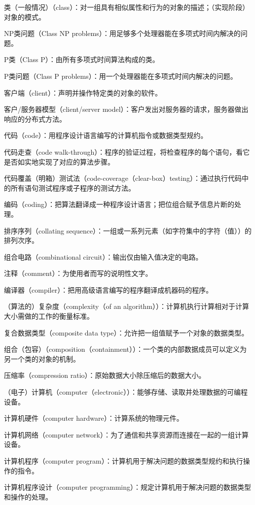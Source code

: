 类（一般情况）（class）：对一组具有相似属性和行为的对象的描述；（实现阶段）对象的模式。

NP类问题（Class NP problems）：用足够多个处理器能在多项式时间内解决的问题。

P类（Class P）：由所有多项式时间算法构成的类。

P类问题（Class P problems）：用一个处理器能在多项式时间内解决的问题。

客户端（client）：声明并操作特定类的对象的软件。

客户/服务器模型（client/server model）：客户发出对服务器的请求，服务器做出响应的分布式方法。

代码（code）：用程序设计语言编写的计算机指令或数据类型规约。

代码走查（code walk-through）：程序的验证过程，将检查程序的每个语句，看它是否如实地实现了对应的算法步骤。

代码覆盖（明箱）测试法（code-coverage（clear-box）testing）：通过执行代码中的所有语句测试程序或子程序的测试方法。

编码（coding）：把算法翻译成一种程序设计语言；把位组合赋予信息片断的处理。

排序序列（collating sequence）：一组或一系列元素（如字符集中的字符（值））的排列次序。

组合电路（combinational circuit）：输出仅由输入值决定的电路。

注释（comment）：为使用者而写的说明性文字。

编译器（compiler）：把用高级语言编写的程序翻译成机器码的程序。

（算法的）复杂度（complexity（of an algorithm））：计算机执行计算相对于计算大小需做的工作的衡量标准。

复合数据类型（composite data type）：允许把一组值赋予一个对象的数据类型。

组合（包容）（composition（containment））：一个类的内部数据成员可以定义为另一个类的对象的机制。

压缩率（compression ratio）：原始数据大小除压缩后的数据大小。

（电子）计算机（computer（electronic））：能够存储、读取并处理数据的可编程设备。

计算机硬件（computer hardware）：计算系统的物理元件。

计算机网络（computer network）：为了通信和共享资源而连接在一起的一组计算设备。

计算机程序（computer program）：计算机用于解决问题的数据类型规约和执行操作的指令。

计算机程序设计（computer programming）：规定计算机用于解决问题的数据类型和操作的处理。

